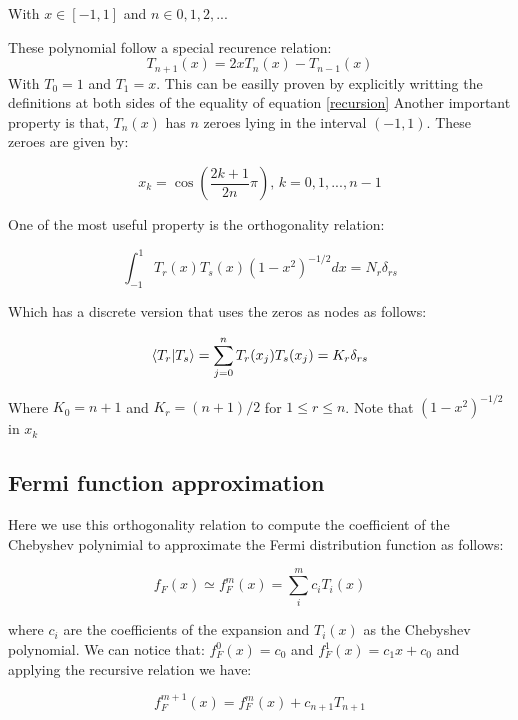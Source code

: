 With $x \in [-1,1]$ and $n \in 0,1,2, ...$

These polynomial follow a special recurence relation: 
%
\begin{equation}
  T_{n+1}(x)= 2xT_{n}(x) - T_{n-1}(x)
  \label{recursion}
\end{equation}
%
With $T_0 = 1$ and $T_1 = x$.
This can be easilly proven by explicitly writting the definitions at both sides of the equality of equation \ref{recursion} 
Another important property is that, $T_n(x)$ has $n$ zeroes lying in the interval $(-1,1)$. These zeroes are given by: 

\begin{equation}
  x_k = \cos\left(\frac{2k+1}{2n}\pi\right), \, k=0,1,...,n-1
  \label{zeroes}
\end{equation}


One of the most useful property is the orthogonality relation:

\begin{equation}
  \int_{-1}^{1}{ T_r(x) T_s(x) (1-x^2)^{-1/2}} dx = N_r\delta_{rs} 
  \label{zeroes}
\end{equation}

Which has a discrete version that uses the zeros as nodes as follows:

\begin{equation}
  \langle T_r | T_s \rangle =  \sum_{j=0}^{n}{T_r(x_j) T_s(x_j)}= K_r\delta_{rs} 
  \label{zeroes}
\end{equation}

Where $K_0 = n + 1$ and $K_r = (n + 1)/2$ for $1 \leq r \leq n$. Note that $(1-x^2)^{-1/2}$ in $x_k$


\subsection{Fermi function approximation}

Here we use this orthogonality relation to compute the coefficient of the Chebyshev polynimial to approximate the Fermi distribution function as follows:

\begin{equation}
  f_F(x) \simeq f^m_F(x) = \sum_i^m c_i T_i(x)
\end{equation}

where $c_i$ are the coefficients of the expansion and $T_i(x)$ as the Chebyshev polynomial.
We can notice that: $f^0_F(x) = c_0$ and $f^1_F(x) = c_1x + c_0$ and applying the recursive relation we have: 

\begin{equation}
  f^{m+1}_F(x) = f^m_F(x) + c_{n+1}T_{n+1}
\end{equation}

